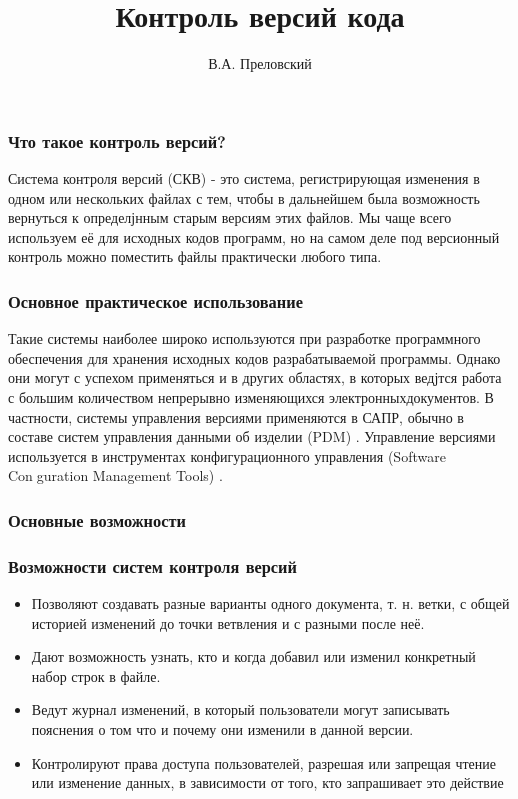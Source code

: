 \documentclass[14pt]{beamer}
\begin{document}
	\author{В.А. Преловский}
	\title{Контроль версий кода}
	\frame[plain]{\maketitle}
	
	\begin{frame}
		\frametitle{Что такое контроль версий?}
		
		Система контроля версий (СКВ) - это система, регистрирующая изменения в одном или нескольких файлах с тем, чтобы в дальнейшем была возможность вернуться к определјнным старым версиям этих файлов.
		Мы чаще всего используем её для исходных кодов программ, но на самом деле под версионный контроль можно поместить файлы практически любого типа.
	\end{frame}

	\begin{frame}
		\frametitle{Основное практическое использование}
		
		{\small Такие системы наиболее широко используются при разработке программного обеспечения для хранения исходных кодов разрабатываемой
		программы. Однако они могут с успехом применяться и в других областях,
		в которых ведјтся работа с большим количеством непрерывно изменяющихся электронныхдокументов. В частности, системы управления версиями применяются в САПР, обычно в составе систем управления данными об
		изделии (PDM) . Управление версиями используется в инструментах конфигурационного управления (Software Conguration Management Tools) .}
\end{frame}

\begin{frame}
	\frametitle{Основные возможности}
\end{frame}

\begin{frame}
	\frametitle{Возможности систем контроля версий}
	{\footnotesize 
		\begin{itemize}
			\item Позволяют создавать разные варианты одного документа, т. н. ветки,
			с общей историей изменений до точки ветвления и с разными после
			неё.
			\item Дают возможность узнать, кто и когда добавил или изменил конкретный набор строк в файле.
			\item Ведут журнал изменений, в который пользователи могут записывать пояснения о том что и почему они изменили в данной версии.
			\item 	Контролируют права доступа пользователей, разрешая или запрещая	чтение или изменение данных, в зависимости от того, кто запрашивает это действие
		\end{itemize}
	}
\end{frame}
\end{document}

